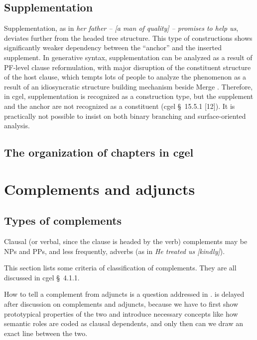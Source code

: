 \documentclass{article}
\newcommand*{\citesec}[1]{\S~{#1}}
\newcommand*{\corpus}[1]{\emph{#1}}
\begin{document}
\subsection{Supplementation}\label{sec:supplmentation}

Supplementation, as in \corpus{her father -- [a man of quality] -- promises to help us},
deviates further from the headed tree structure.
This type of constructions shows significantly weaker dependency 
between the ``anchor'' and the inserted supplement.
In generative syntax, supplementation can be analyzed as a result of PF-level clause reformulation,
with major disruption of the constituent structure of the host clause, 
which tempts lots of people to analyze the phenomenon 
as a result of an idiosyncratic structure building mechanism beside Merge \citep{ott2014ellipsis}.
Therefore, in \ac{cgel}, supplementation is recognized as a construction type,
but the supplement and the anchor are not recognized as a constituent (\ac{cgel} \citesec{15.5.1} [12]).
It is practically not possible to insist on both binary branching and surface-oriented analysis.

\subsection{The organization of chapters in \ac{cgel}}

\section{Complements and adjuncts}

\subsection{Types of complements}\label{sec:types-of-complements}

Clausal (or verbal, since the clause is headed by the verb) complements 
may be NPs and PPs, and less frequently, adverbs 
(as in \corpus{He treated us [kindly]}). %

This section lists some criteria of classification of complements.
They are all discussed in \ac{cgel} \citesec{4.1.1}.


How to tell a complement from adjuncts is a question addressed in .
 is delayed after discussion on complements and adjuncts,
because we have to first show prototypical properties of the two 
and introduce necessary concepts like how semantic roles are coded as clausal dependents,
and only then can we draw an exact line between the two.
\end{document}
